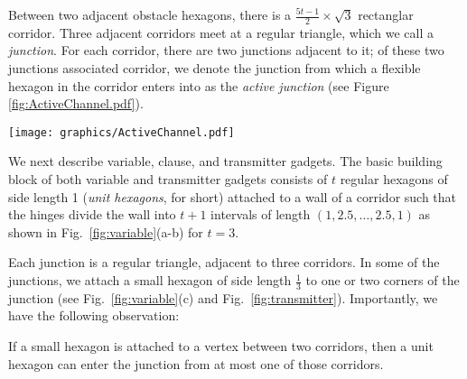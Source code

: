 Between two adjacent obstacle hexagons, there is a $\frac{5t-1}{2}\times \sqrt{3}$ rectanglar corridor.  %
Three adjacent corridors meet at a regular triangle, which we call a \emph{junction}. 
For each corridor, there are two junctions adjacent to it; of these two junctions associated corridor, we denote the junction from which a flexible hexagon in the corridor enters into as the \textit{active junction} (see Figure \ref{fig:ActiveChannel.pdf}).

\begin{minipage}{\linewidth}
\begin{center}
\texttt{[image: graphics/ActiveChannel.pdf]}
\label{fig:ActiveChannel.pdf}
\end{center}
\end{minipage}

We next describe variable, clause, and transmitter gadgets.
The basic building block of both variable and transmitter gadgets consists of $t$ regular hexagons of side length 1 (\emph{unit hexagons}, for short) attached to a wall of a corridor such that the hinges divide the wall into $t+1$ intervals of length $(1,2.5,\ldots ,2.5,1)$ as shown in Fig.~\ref{fig:variable}(a-b) for $t=3$. 


Each junction is a regular triangle, adjacent to three corridors. 
In some of the junctions, we attach a small hexagon of side length $\frac{1}{3}$ to one or two corners of the junction (see Fig.~\ref{fig:variable}(c) and Fig.~\ref{fig:transmitter}). 
Importantly, we have the following observation:
\begin{observation}\label{obs:junction}
If a small hexagon is attached to a vertex between two corridors, then a unit hexagon can enter the junction from at most one of those corridors.
\end{observation}

